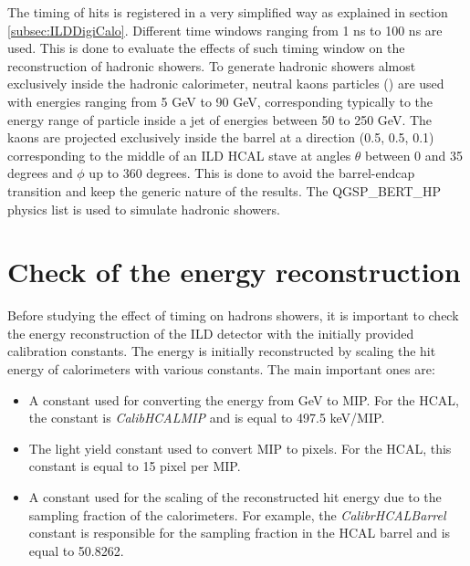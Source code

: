 \label{sec:ILDTiming}

The timing of hits is registered in a very simplified way as explained in section \ref{subsec:ILDDigiCalo}. Different time windows ranging from 1 ns to 100 ns are used. This is done to evaluate the effects of such timing window on the reconstruction of hadronic showers. To generate hadronic showers almost exclusively inside the hadronic calorimeter, neutral kaons particles (\kzeroL{}) are used with energies ranging from 5 GeV to 90 GeV, corresponding typically to the energy range of particle inside a jet of energies between 50 to 250 GeV. The kaons are projected exclusively inside the barrel at a direction (0.5, 0.5, 0.1) corresponding to the middle of an ILD HCAL stave at angles $\theta$ between 0 and 35 degrees and $\phi$ up to 360 degrees. This is done to avoid the barrel-endcap transition and keep the generic nature of the results. The QGSP\_BERT\_HP physics list is used to simulate hadronic showers.

\section{Check of the energy reconstruction}

Before studying the effect of timing on hadrons showers, it is important to check the energy reconstruction of the ILD detector with the initially provided calibration constants. The energy is initially reconstructed by scaling the hit energy of calorimeters with various constants. The main important ones are:
\begin{itemize}
  \item A constant used for converting the energy from GeV to MIP. For the HCAL, the constant is \textit{CalibHCALMIP} and is equal to 497.5 keV/MIP.
  \item The light yield constant used to convert MIP to pixels. For the HCAL, this constant is equal to 15 pixel per MIP.
  \item A constant used for the scaling of the reconstructed hit energy due to the sampling fraction of the calorimeters. For example, the \textit{CalibrHCALBarrel} constant is responsible for the sampling fraction in the HCAL barrel and is equal to 50.8262.
\end{itemize}

